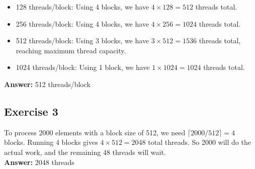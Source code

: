 \documentclass{article}
\begin{document}
\begin{itemize}
    \item 128 threads/block: Using 4 blocks, we have $4 \times 128 = 512$ threads total.
    \item 256 threads/block: Using 4 blocks, we have $4 \times 256 = 1024$ threads total.
    \item 512 threads/block: Using 3 blocks, we have $3 \times 512 = 1536$ threads total, reaching maximum thread capacity.
    \item 1024 threads/block: Using 1 block, we have $1 \times 1024 = 1024$ threads total.
\end{itemize}
\noindent\textbf{Answer:} 512 threads/block


\subsection*{Exercise 3}

To process 2000 elements with a block size of 512, we need $\lceil 2000 / 512 \rceil = 4$ blocks. Running 4 blocks gives $4 \times 512 = 2048$ total threads. So 2000 will do the actual work, and the remaining 48 threads will wait. \\

\noindent\textbf{Answer:} 2048 threads
\end{document}
